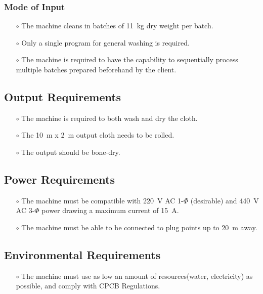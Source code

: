 \subsubsection{Mode of Input}
\begin{itemize}
    \item[$\scriptstyle\circ$] The machine cleans in batches of \SI{11}{\kilogram} dry weight per batch.
    \item[$\scriptstyle\circ$] Only a single program for general washing is required.
    \item[$\scriptstyle\circ$]The machine is required to have the capability to sequentially process multiple batches prepared beforehand by the client. 
\end{itemize}

\subsection{Output Requirements}
\begin{itemize}
    \item[$\scriptstyle\circ$] The machine is required to both wash and dry the cloth. 
    \item [$\scriptstyle\circ$] The \SI{10}{\meter} x \SI{2}{\meter} output cloth needs to be rolled.
    \item [$\scriptstyle\circ$] The output should be bone-dry.
\end{itemize}
\subsection{Power Requirements}
\begin{itemize}
    \item[$\scriptstyle\circ$] The machine must be compatible with \SI{220}{\volt} AC 1-$\Phi$ (desirable) and \SI{440}{\volt} AC 3-$\Phi$ power drawing a maximum current of \SI{15}{\ampere}.
    \item[$\scriptstyle\circ$] The machine must be able to be connected to plug points up to \SI{20}{\meter} away. 
\end{itemize}
\subsection{Environmental Requirements}
\begin{itemize}
    \item[$\scriptstyle\circ$] The machine must use as low an amount of resources(water, electricity) as possible, and comply with \Gls{CPCB Regulations}. 
\end{itemize}

